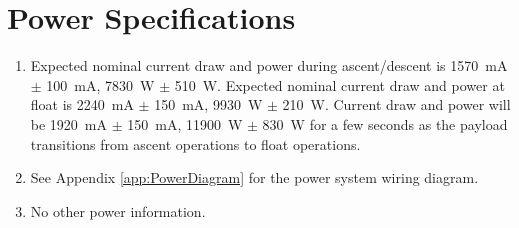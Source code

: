 \newpage
\section{Power Specifications}
\label{sec:Power}

\hspace*{0.5cm}
\begin{minipage}{\linewidth-0.5cm}
  \begin{enumerate}[label=\Alph*.]
  \item Expected nominal current draw and power during ascent/descent is \SI{1570}{\milli\ampere} $\pm$ \SI{100}{\milli\ampere}, \SI{7830}{\watt} $\pm$ \SI{510}{\watt}. Expected nominal current draw and power at float is \SI{2240}{\milli\ampere} $\pm$ \SI{150}{\milli\ampere}, \SI{9930}{\watt} $\pm$ \SI{210}{\watt}. Current draw and power will be \SI{1920}{\milli\ampere} $\pm$ \SI{150}{\milli\ampere}, \SI{11900}{\watt} $\pm$ \SI{830}{\watt} for a few seconds as the payload transitions from ascent operations to float operations. 
  \item See Appendix \ref{app:PowerDiagram} for the power system wiring diagram.  
  \item No other power information. 
  \end{enumerate}
\end{minipage}

